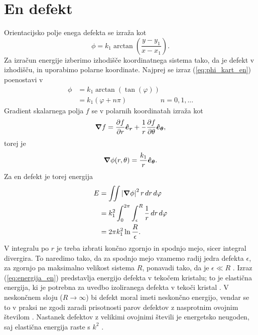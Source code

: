 \documentclass[11pt]{article}
\begin{document}
\section{En defekt}
\label{sec:en}
Orientacijsko polje enega defekta se izraža kot
\begin{equation}
\label{eq:phi_kart_en}
    \phi=k_1 \arctan\left(\frac{y-y_{1}}{x-x_{1}}\right).
\end{equation}
Za izračun energije izberimo izhodišče koordinatnega sistema tako, da je defekt v izhodišču, in uporabimo polarne koordinate. Najprej se izraz (\ref{eq:phi_kart_en}) poenostavi v
\begin{align}
    \phi&=k_1 \arctan(\tan(\varphi)) \nonumber \\
    &= k_1 (\varphi + n\pi)\hspace{2cm}   n = 0,1, ... \nonumber
\end{align}
Gradient skalarnega polja $f$ se v polarnih koordinatah izraža kot
\begin{equation*}
    \grad f = \frac{\partial f}{\partial r}\bm{\hat{e}_{r}} + \frac{1}{r}\frac{\partial f}{\partial \theta}\bm{\hat{e}_{\theta}},
\end{equation*}
torej je
\begin{equation*}
    \grad \phi(r, \theta) = \frac{k_1}{r}\bm{\hat{e}_{\theta}}.
\end{equation*}
Za en defekt je torej energija
\begin{align}
    E &= \iint \left|\grad\phi\right|^{2}r\,dr\,d\varphi \nonumber \\
    &= k_{1}^{2}\int_{0}^{2\pi}\int_{\epsilon}^{R} \frac{1}{r} \,dr\,d\varphi \nonumber \\
    &= 2\pi k_{1}^{2} \ln{\frac{R}{\epsilon}}. \label{eq:energija_en}
\end{align}
V integralu po $r$ je treba izbrati končno zgornjo in spodnjo mejo, sicer integral divergira. To naredimo tako, da za spodnjo mejo vzamemo radij jedra defekta $\epsilon$, za zgornjo pa maksimalno velikost sistema $R$, ponavadi tako, da je $\epsilon \ll R$ \cite{chandrasekhar1986structure}.
Izraz (\ref{eq:energija_en}) predstavlja energijo defekta v tekočem kristalu; to je elastična energija, ki je potrebna za uvedbo izoliranega defekta v tekoči kristal \cite{chandrasekhar1986structure}. V neskončnem sloju ($R \to \infty$) bi defekt moral imeti neskončno energijo, vendar se to v praksi ne zgodi zaradi prisotnosti parov defektov z nasprotnim ovojnim številom \cite{chandrasekhar1986structure}. Nastanek defektov z velikimi ovojnimi števili je energetsko neugoden, saj elastična energija raste s $k^{2}$ \cite{andrienko2018introduction}. 
\end{document}
